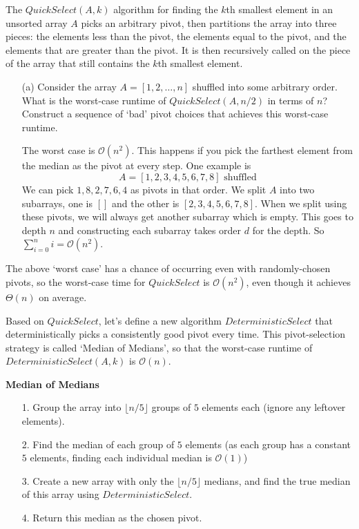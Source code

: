 \documentclass{article}
\begin{document}
The $QuickSelect(A, k)$ algorithm for finding the $k$th smallest element in an unsorted array $A$ picks an arbitrary pivot, then partitions the array into three pieces: the elements less than the pivot, the elements equal to the pivot, and the elements that are greater than the pivot. It is then recursively called on the piece of the array that still contains the $k$th smallest element.
    \begin{itemize}
        \item [(a)] Consider the array $A = [1, 2, \ldots, n]$ shuffled into some arbitrary order. What is the worst-case runtime of $QuickSelect(A, n/2)$ in terms of $n$? Construct a sequence of ‘bad’ pivot choices that achieves this worst-case runtime. 
            \begin{answer}
                The worst case is $\mathcal{O}(n^{2})$. This happens if you pick the farthest element from the median as the pivot at every step. One example is
                    \begin{equation*}
                        A = [1, 2, 3, 4, 5, 6, 7, 8] \text{ shuffled}
                    \end{equation*}
                We can pick $1, 8, 2, 7, 6, 4$ as pivots in that order. We split $A$ into two subarrays, one is $[]$ and the other is $[2, 3, 4, 5, 6, 7, 8]$. When we split using these pivots, we will always get another subarray which is empty. This goes to depth $n$ and constructing each subarray takes order $d$ for the depth. So $\sum_{i = 0}^{n} i = \mathcal{O}(n^{2})$.
            \end{answer}
    \end{itemize}
The above ‘worst case’ has a chance of occurring even with randomly-chosen pivots, so the worst-case time for $QuickSelect$ is $\mathcal{O}(n^{2})$, even though it achieves $\Theta(n)$ on average.

Based on $QuickSelect$, let’s define a new algorithm $DeterministicSelect$ that deterministically picks a consistently good pivot every time. This pivot-selection strategy is called ‘Median of Medians’, so that the worst-case runtime of $DeterministicSelect(A, k)$ is $\mathcal{O}(n)$.

    \textbf{Median of Medians}
        \begin{itemize}
            \item [1.] Group the array into $\lfloor n / 5 \rfloor$ groups of $5$ elements each (ignore any leftover elements).

            \item [2.] Find the median of each group of $5$ elements (as each group has a constant $5$ elements, finding each individual median is $\mathcal{O}(1)$)

            \item [3.] Create a new array with only the $\lfloor n / 5 \rfloor$ medians, and find the true median of this array using $DeterministicSelect$.

            \item [4.] Return this median as the chosen pivot. 
        \end{itemize}
\end{document}
